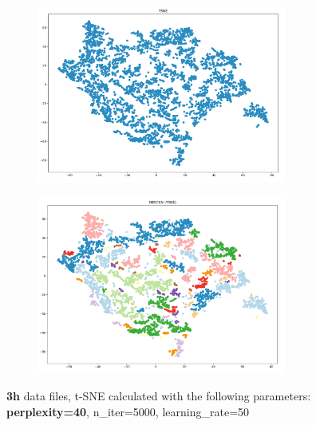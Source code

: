 \begin{figure}[H]
  \centering
	\begin{subfigure}{.5\textwidth}
    \centering
    \includegraphics[width=0.9\textwidth]{./images/tsneParametersTest/perplexity/perp40-3hTSNE.png}
  \end{subfigure}%
  \begin{subfigure}{.5\textwidth}
    \centering
    \includegraphics[width=0.9\textwidth]{./images/tsneParametersTest/perplexity/perp40-3hDBSCAN.png}
	\end{subfigure}
	\caption{\textbf{3h} data files, t-SNE calculated with the following parameters: \textbf{perplexity=40}, n\_iter=5000, learning\_rate=50}
  \label{figure:3hperp40TSNE}
\end{figure}



